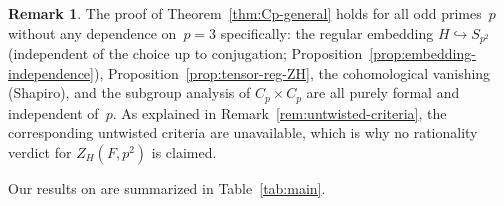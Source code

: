\documentclass[12pt,a4paper]{article}
\theoremstyle{definition}
\newtheorem{remark}[theorem]{Remark}
\begin{document}
\begin{remark}
The proof of Theorem~\ref{thm:Cp-general} holds for all odd primes~\(p\)
without any dependence on~\(p=3\) specifically:
the regular embedding \(H \hookrightarrow S_{p^2}\)
(independent of the choice up to conjugation;
Proposition~\ref{prop:embedding-independence}),
Proposition~\ref{prop:tensor-reg-ZH},
the cohomological vanishing (Shapiro), and the subgroup
analysis of \(C_p \times C_p\) are all purely formal and independent
of~\(p\).  As explained in Remark~\ref{rem:untwisted-criteria}, the
corresponding untwisted criteria are unavailable, which is why no
rationality verdict for \(Z_H(F, p^2)\) is claimed.
\end{remark}

Our results on \cite[Problem~5.2]{ABGV2011} are summarized in
Table~\ref{tab:main}.
\end{document}

